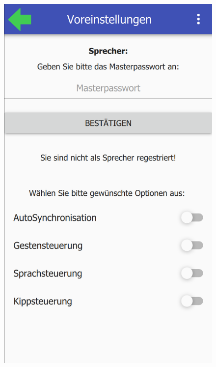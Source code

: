 \begin{figure}[ht!]
\begin{minipage}{0.31\linewidth}
		\includegraphics[scale=0.5]{GUI/Bilder/3_S_1_Voreinstellung.PNG}
	\end{minipage}
	\begin{minipage}{0.31\linewidth}
		\centering

\end{minipage}
\end{figure}
